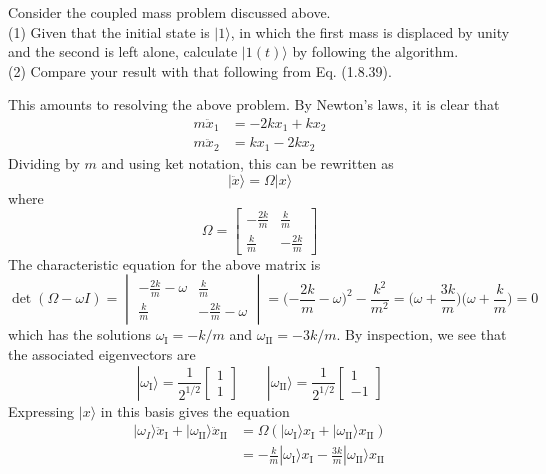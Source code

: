 \documentclass[../principles-of-quantum-mechanics.tex]{subfiles}
\begin{document}
\begin{questions}
\question Consider the coupled mass problem discussed above. \\
(1) Given that the initial state is $|1\rangle$, in which the first mass is displaced by unity and the second is left alone, calculate $|1(t)\rangle$ by following the algorithm. \\
(2) Compare your result with that following from Eq. (1.8.39).

\begin{solution}
	This amounts to resolving the above problem. By Newton's laws, it is clear that
	\begin{align*}
		m\ddot{x}_1 &= {-2k}x_1 + kx_2 \\
		m\ddot{x}_2 &= kx_1 - 2kx_2
	\end{align*}
	Dividing by $m$ and using ket notation, this can be rewritten as
	\[
		|\ddot{x}\rangle = \Omega|x\rangle
	\]
	where
	\[
		\Omega = \begin{bmatrix}
			-\frac{2k}{m} & \frac{k}{m} \\
			\frac{k}{m} & -\frac{2k}{m}
		\end{bmatrix}
	\]
	The characteristic equation for the above matrix is
	\[
		\det(\Omega - \omega{I}) = \begin{vmatrix} -\frac{2k}{m} - \omega & \frac{k}{m} \\ \frac{k}{m} & -\frac{2k}{m} - \omega\end{vmatrix} = \Big({-\frac{2k}{m}} - \omega\Big)^2 - \frac{k^2}{m^2} = \Big(\omega + \frac{3k}{m}\Big)\Big(\omega + \frac{k}{m}\Big) = 0
	\]
	which has the solutions $\omega_{\mathrm{I}} = -k/m$ and $\omega_{\mathrm{II}} = -3k/m$. By inspection, we see that the associated eigenvectors are
	\[
		|\omega_{\mathrm{I}}\rangle = \frac{1}{2^{1/2}}\begin{bmatrix}1 \\ 1\end{bmatrix} \qquad |\omega_{\mathrm{II}}\rangle = \frac{1}{2^{1/2}}\begin{bmatrix}1 \\ -1\end{bmatrix}
	\]
	Expressing $|x\rangle$ in this basis gives the equation
	\begin{align*}
		|\omega_I\rangle\ddot{x}_{\mathrm{I}} + |\omega_{\mathrm{II}}\rangle\ddot{x}_{\mathrm{II}} &= \Omega(|\omega_{\mathrm{I}}\rangle{x}_{\mathrm{I}} + |\omega_{\mathrm{II}}\rangle{x}_{\mathrm{II}}) \\
		&= {-\frac{k}{m}}|\omega_{\mathrm{I}}\rangle x_{\mathrm{I}} - \frac{3k}{m}|\omega_{\mathrm{II}}\rangle x_{\mathrm{II}}

\end{align*}
\end{solution}
\end{questions}
\end{document}
